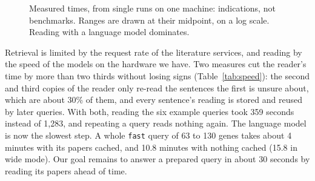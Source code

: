 \documentclass[11pt,a4paper]{article}
\newcommand{\code}[1]{\texttt{#1}}
\begin{document}
\begin{figure}[htbp]
\centering
{}
\caption{Measured times, from single runs on one machine: indications, not benchmarks. Ranges are
drawn at their midpoint, on a log scale. Reading with a language model dominates.}
\label{fig:times}
\end{figure}

Retrieval is limited by the request rate of the literature services, and reading by the speed of
the models on the hardware we have. Two measures cut the reader's time by more than two thirds
without losing signs
(Table~\ref{tab:speed}): the second and third copies of the reader only re-read the sentences the first
is unsure about, which are about 30\% of them, and every sentence's reading is stored and reused
by later queries. With both, reading the six example queries took 359 seconds instead of 1,283,
and repeating a query reads nothing again. The language model is now the slowest step. A whole
\code{fast} query of 63 to 130 genes takes about 4 minutes with its papers cached, and 10.8
minutes with nothing cached (15.8 in wide mode). Our goal
remains to answer a prepared query in about 30 seconds by reading its papers ahead of time.
\end{document}
